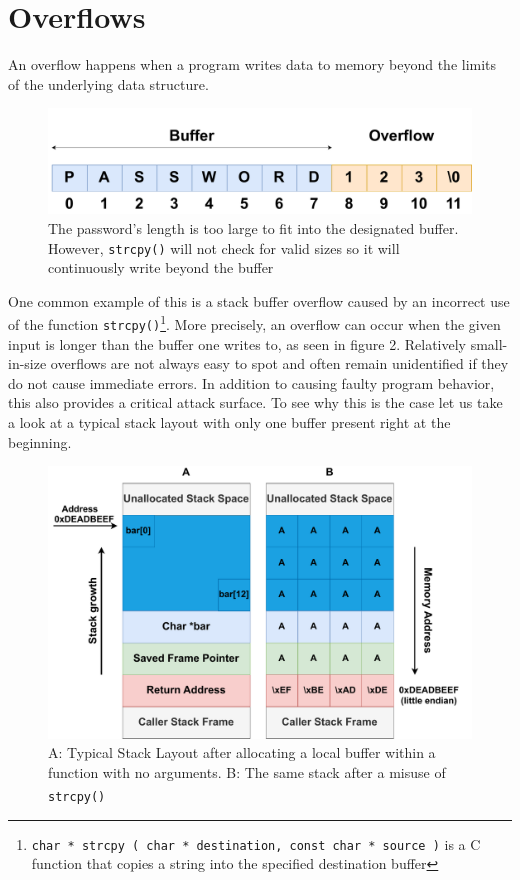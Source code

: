 \documentclass[10pt,twocolumn,a4paper]{article}
\begin{document}
\section{Overflows}\label{sec:Overflows}
An overflow happens when a program writes data to memory beyond the limits of the underlying data structure.
\begin{figure}[h]
\centering
\includegraphics[keepaspectratio,width=\linewidth,trim={0 0 0 1.5cm}]{fig/simpleoverflow}
\caption{The password's length is too large to fit into the designated buffer. However, \texttt{strcpy()} will not check for valid sizes so it will continuously write beyond the buffer}
\end{figure}\newline
One common example of this is a stack buffer overflow caused by an incorrect use of the function \texttt{strcpy()}\footnote{\texttt{char * strcpy ( char * destination, const char * source )} is a C function that copies a string into the specified destination buffer}.\newline
More precisely, an overflow can occur when the given input is longer than the buffer one writes to, as seen in figure 2.
Relatively small-in-size overflows are not always easy to spot and often remain unidentified if they do not cause immediate errors.
In addition to causing faulty program behavior, this also provides a critical attack surface.
To see why this is the case let us take a look at a typical stack layout with only one buffer present right at the beginning.
\begin{figure}[h]
	\begin{center}
		\centering
		\includegraphics[keepaspectratio,width=\linewidth,trim={1cm 0 1cm 0}]{fig/Stacks}
		\caption{ A: Typical Stack Layout after allocating a local buffer within a function with no arguments. \newline B: The same stack after a misuse of \texttt{strcpy()}\textsuperscript{\cite{wiki}}}
	\end{center}
\end{figure} 
\end{document}
